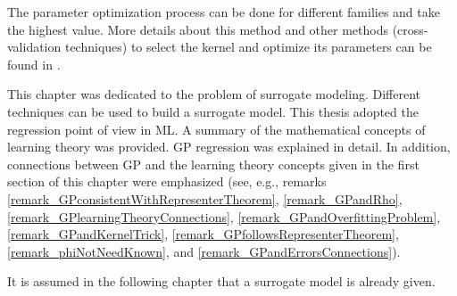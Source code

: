 The parameter optimization process can be done for different families and take the highest value. 
More details about this method and other methods (cross-validation techniques) to select the kernel and optimize its parameters can be found in \textcite{rasmussen2006}. 

\vspace{10mm}
\noindent
This chapter was dedicated to the problem of surrogate modeling.
Different techniques can be used to build a surrogate model.
This thesis adopted the regression point of view in ML. 
A summary of the mathematical concepts of learning theory was provided.
GP regression was explained in detail.
In addition, connections between GP and the learning theory concepts given in the first section of this chapter were emphasized (see, e.g., remarks \ref{remark_GPconsistentWithRepresenterTheorem}, \ref{remark_GPandRho}, \ref{remark_GPlearningTheoryConnections}, \ref{remark_GPandOverfittingProblem}, \ref{remark_GPandKernelTrick}, \ref{remark_GPfollowsRepresenterTheorem}, \ref{remark_phiNotNeedKnown}, and \ref{remark_GPandErrorsConnections}).

It is assumed in the following chapter that a surrogate model is already given.



